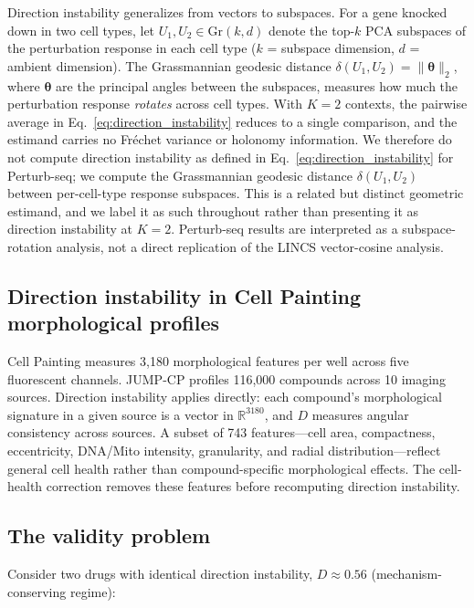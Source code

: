 \documentclass[11pt]{article}
\begin{document}
Direction instability generalizes from vectors to subspaces. For a gene
knocked down in two cell types, let $U_1, U_2 \in \text{Gr}(k, d)$ denote
the top-$k$ PCA subspaces of the perturbation response in each cell type
($k$ = subspace dimension, $d$ = ambient dimension).
The Grassmannian geodesic distance $\delta(U_1, U_2) =
\|\boldsymbol{\theta}\|_2$, where $\boldsymbol{\theta}$ are the principal
angles between the subspaces, measures how much the perturbation response
\emph{rotates} across cell types. With $K = 2$ contexts, the pairwise
average in Eq.~\ref{eq:direction_instability} reduces to a single
comparison, and the estimand carries no Fr\'{e}chet variance or holonomy
information. We therefore do not compute direction instability as defined
in Eq.~\ref{eq:direction_instability} for Perturb-seq; we compute the
Grassmannian geodesic distance $\delta(U_1, U_2)$ between per-cell-type
response subspaces. This is a related but distinct geometric estimand, and
we label it as such throughout rather than presenting it as direction
instability at $K = 2$. Perturb-seq results are interpreted as a
subspace-rotation analysis, not a direct replication of the LINCS
vector-cosine analysis.

\subsection{Direction instability in Cell Painting morphological profiles}

Cell Painting \citep{chandrasekaran2023jump} measures 3{,}180 morphological
features per well across five fluorescent channels. JUMP-CP
profiles 116{,}000 compounds across 10 imaging sources. Direction
instability applies directly: each compound's morphological signature in a
given source is a vector in $\mathbb{R}^{3180}$, and $D$ measures angular
consistency across sources. A subset of 743 features---cell area, compactness,
eccentricity, DNA/Mito intensity, granularity, and radial
distribution---reflect general cell health rather than compound-specific
morphological effects. The cell-health correction removes these features
before recomputing direction instability.

\subsection{The validity problem}

Consider two drugs with identical direction instability, $D \approx 0.56$
(mechanism-conserving regime):
\end{document}
